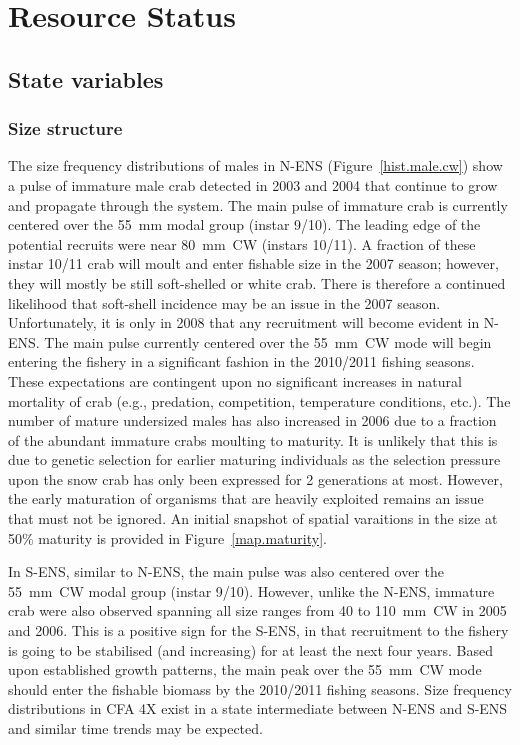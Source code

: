 \documentclass[11pt]{article}
\begin{document}
\section{Resource Status}

\subsection{State variables}

\subsubsection{Size structure}

The size frequency distributions of males in N-ENS (Figure~\ref{hist.male.cw}) show a pulse of immature male crab detected in 2003 and 2004 that continue to grow and propagate through the system. The main pulse of immature crab is currently centered over the 55~mm modal group (instar 9/10). The leading edge of the potential recruits were near 80~mm~CW (instars 10/11). A fraction of these instar 10/11 crab will moult and enter fishable size in the 2007 season; however, they will mostly be still soft-shelled or white crab. There is therefore a continued likelihood that soft-shell incidence may be an issue in the 2007 season. Unfortunately, it is only in 2008 that any recruitment will become evident in N-ENS. The main pulse currently centered over the 55~mm~CW mode will begin entering the fishery in a significant fashion in the 2010/2011 fishing seasons. These expectations are contingent upon no significant increases in natural mortality of crab (e.g., predation, competition, temperature conditions, etc.). The number of mature undersized males has also increased in 2006 due to a fraction of the abundant immature crabs moulting to maturity. It is unlikely that this is due to genetic selection for earlier maturing individuals as the selection pressure upon the snow crab has only been expressed for 2 generations at most. However, the early maturation of organisms that are heavily exploited remains an issue that must not be ignored. An initial snapshot of spatial varaitions in the size at 50\% maturity is provided in Figure~\ref{map.maturity}.

In S-ENS, similar to N-ENS, the main pulse was also centered over the 55~mm~CW modal group (instar 9/10). However, unlike the N-ENS, immature crab were also observed spanning all size ranges from 40 to 110~mm~CW in 2005 and 2006. This is a positive sign for the S-ENS, in that recruitment to the fishery is going to be stabilised (and increasing) for at least the next four years. Based upon established growth patterns, the main peak over the 55~mm~CW mode should enter the fishable biomass by the 2010/2011 fishing seasons. Size frequency distributions in CFA 4X exist in a state intermediate between N-ENS and S-ENS and similar time trends may be expected.
\end{document}
